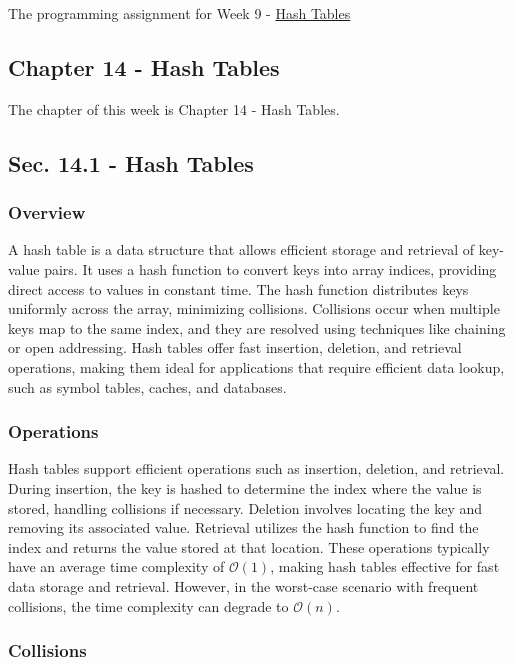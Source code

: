 The programming assignment for Week 9 - \href{https://github.com/cu-cspb-2270-Summer-2023/pa7-RelativiBit}{Hash Tables}

\subsection{Chapter 14 - Hash Tables}

The chapter of this week is Chapter 14 - Hash Tables.

\subsection*{Sec. 14.1 - Hash Tables}

\subsubsection{Overview}

A hash table is a data structure that allows efficient storage and retrieval of key-value pairs. It uses a hash function to convert keys into array indices, providing direct access to values in constant 
time. The hash function distributes keys uniformly across the array, minimizing collisions. Collisions occur when multiple keys map to the same index, and they are resolved using techniques like chaining 
or open addressing. Hash tables offer fast insertion, deletion, and retrieval operations, making them ideal for applications that require efficient data lookup, such as symbol tables, caches, and databases.

\subsubsection{Operations}

Hash tables support efficient operations such as insertion, deletion, and retrieval. During insertion, the key is hashed to determine the index where the value is stored, handling collisions if necessary. 
Deletion involves locating the key and removing its associated value. Retrieval utilizes the hash function to find the index and returns the value stored at that location. These operations typically have an 
average time complexity of $\mathcal{O}(1)$, making hash tables effective for fast data storage and retrieval. However, in the worst-case scenario with frequent collisions, the time complexity can degrade to 
$\mathcal{O}(n)$.

\subsubsection{Collisions}


